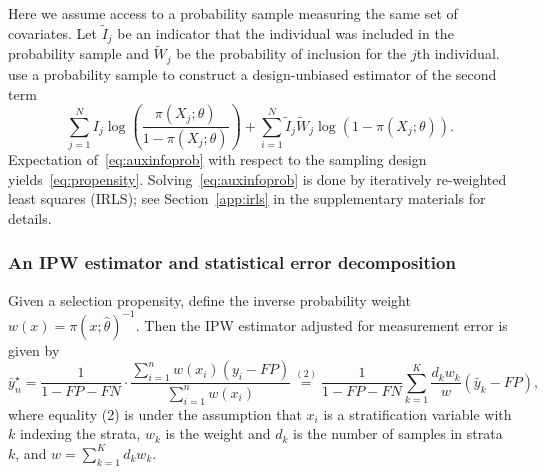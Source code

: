 \documentclass[11pt]{amsart}
\numberwithin{equation}{section}
\theoremstyle{plain}
\begin{document}
 Here we assume access to a probability sample measuring the same set of covariates.  Let $\tilde I_j$ be an indicator that the individual was included in the probability sample and $\tilde W_j$ be the probability of inclusion for the $j$th individual. \cite{Chen2019} use a probability sample to construct a design-unbiased estimator of the second term
 \begin{equation}
 \label{eq:auxinfoprob}
 \sum_{j=1}^N I_j \log \left( \frac{\pi (X_j; \theta)}{1-\pi(X_j; \theta)} \right)  + \sum_{i=1}^N \tilde I_j \tilde W_j \log ( 1 - \pi (X_j; \theta)).
 \end{equation}
 Expectation of~\ref{eq:auxinfoprob} with respect to the sampling design yields~\eqref{eq:propensity}. Solving~\eqref{eq:auxinfoprob} is done by iteratively re-weighted least squares (IRLS); see Section~\ref{app:irls} in the supplementary materials for details.




 \subsubsection{An IPW estimator and statistical error decomposition}
 \label{section:IPWerrordecomp}

 Given a selection propensity, define the inverse probability weight~$w(x) = \pi (x; \hat \theta)^{-1}$. Then the IPW estimator adjusted for measurement error is given by
 \begin{equation}
 \label{eq:ipwest}
 \bar y_n^\star
 = \frac{1}{1-FP-FN} \cdot \frac{\sum_{i=1}^n w(x_i) (y_i - FP)}{\sum_{i=1}^n w (x_i)}
 \stackrel{(2)}{=} \frac{1}{1-FP-FN} \sum_{k=1}^K \frac{d_k w_k}{w} (\bar y_k - FP),
 \end{equation}
 where equality (2) is under the assumption that $x_i$ is a stratification variable with $k$ indexing the strata, $w_k$ is the weight and $d_k$ is the number of samples in strata $k$, and $w = \sum_{k=1}^K d_k w_k$.
\end{document}
